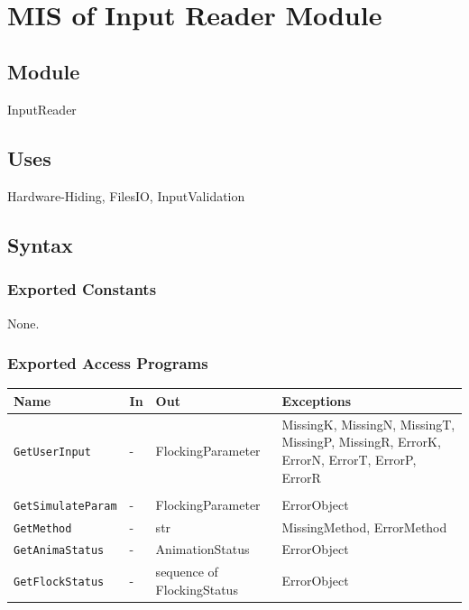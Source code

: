 \documentclass[12pt, titlepage]{article}
\begin{document}
~\newpage

\section{MIS of Input Reader Module} \label{mInput}

\subsection{Module}

InputReader

\subsection{Uses}

Hardware-Hiding, FilesIO, InputValidation

\subsection{Syntax}

\subsubsection{Exported Constants}

None.

\subsubsection{Exported Access Programs}

\begin{center}
\begin{tabular}{p{4cm} p{4cm} p{4cm} p{2cm}}
\hline
\textbf{Name} & \textbf{In} & \textbf{Out} & \textbf{Exceptions} \\
\hline
\texttt{GetUserInput} & - & FlockingParameter & MissingK, 
MissingN, MissingT, MissingP, MissingR, ErrorK, ErrorN, ErrorT, ErrorP, ErrorR \\ \\
\texttt{GetSimulateParam} & - & FlockingParameter & ErrorObject \\
\texttt{GetMethod} & - & str & MissingMethod, ErrorMethod \\
\texttt{GetAnimaStatus} & - & AnimationStatus & ErrorObject \\
\texttt{GetFlockStatus} & - & sequence of FlockingStatus & ErrorObject \\
\hline
\end{tabular}
\end{center}
\end{document}

